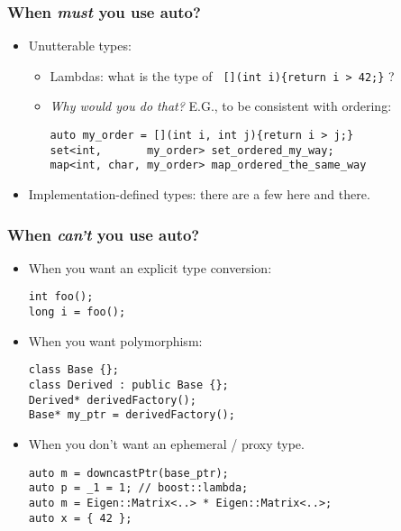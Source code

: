 \begin{frame}[fragile]
\end{frame}

\begin{frame}[fragile]
\frametitle{When \emph{must} you use auto?}

\begin{itemize} %
\item Unutterable types:
  \begin{itemize} %
    \item Lambdas: what is the type of {\scriptsize\texttt{  [](int i)\{return i > 42;\}}} ?
    \item \emph{Why would you do that?}  E.G., to
      be consistent with ordering:
{\scriptsize
\begin{verbatim} 
auto my_order = [](int i, int j){return i > j;}
set<int,       my_order> set_ordered_my_way;
map<int, char, my_order> map_ordered_the_same_way
\end{verbatim}
}
  
  \end{itemize} %
\vskip 12pt
\item Implementation-defined types: there are a few here and there.

\end{itemize} %

\end{frame}

\begin{frame}[fragile]
\frametitle{When \emph{can't} you use auto?}

\begin{itemize} %
\item When you want an explicit type conversion:
{\scriptsize
\begin{verbatim}
int foo(); 
long i = foo(); 
\end{verbatim}
}
\vskip 6pt

\item When you want polymorphism:
{\scriptsize
\begin{verbatim}
class Base {};    
class Derived : public Base {};
Derived* derivedFactory();
Base* my_ptr = derivedFactory();
\end{verbatim} }     
\vskip 6pt
\item When you don't want an ephemeral / proxy type.
{\scriptsize 
\begin{verbatim}
auto m = downcastPtr(base_ptr);
auto p = _1 = 1; // boost::lambda;
auto m = Eigen::Matrix<..> * Eigen::Matrix<..>;
auto x = { 42 };
\end{verbatim}
}     


\end{itemize} %
\end{frame}

